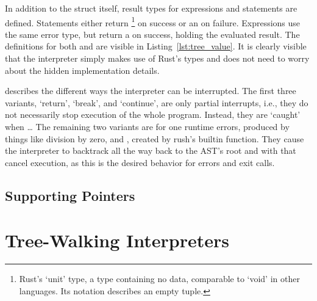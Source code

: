 
            In addition to the struct itself, result types for expressions and statements are defined.
            Statements either return \qVerb{()}\footnote{Rust's `unit' type, a type containing no data, comparable to `void' in other languages. Its notation describes an empty tuple.} on success or an  on failure.
            Expressions use the same error type, but return a  on success, holding the evaluated result.
            The definitions for both  and  are visible in Listing~\ref{lst:tree_value}.
            It is clearly visible that the interpreter simply makes use of Rust's types and does not need to worry about the hidden implementation details.


             describes the different ways the interpreter can be interrupted.
            The first three variants, `return', `break', and `continue', are only partial interrupts, i.e., they do not necessarily stop execution of the whole program.
            Instead, they are `caught' when \ldots
            The remaining two variants are for one runtime errors, produced by things like division by zero, and , created by rush's builtin  function.
            They cause the interpreter to backtrack all the way back to the AST's root and with that cancel execution, as this is the desired behavior for errors and exit calls.

            \subsection{Supporting Pointers}\label{sec:tree_pointers}

            \section{Tree-Walking Interpreters}

